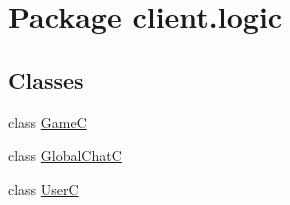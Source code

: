 \hypertarget{namespaceclient_1_1logic}{}\section{Package client.\+logic}
\label{namespaceclient_1_1logic}
\subsection*{Classes}
\begin{DoxyCompactItemize}
\item 
class \hyperlink{classclient_1_1logic_1_1_game_c}{GameC}
\item 
class \hyperlink{classclient_1_1logic_1_1_global_chat_c}{Global\+ChatC}
\item 
class \hyperlink{classclient_1_1logic_1_1_user_c}{UserC}
\end{DoxyCompactItemize}
